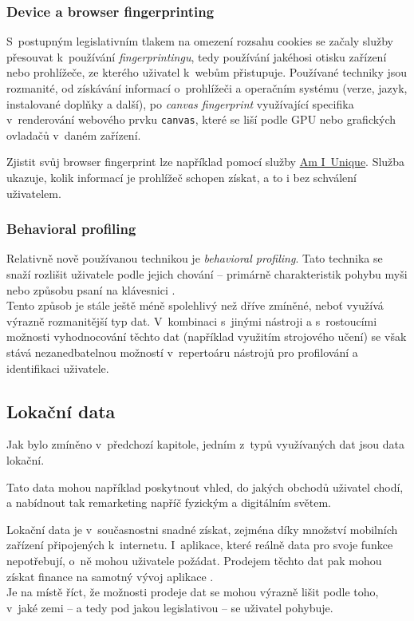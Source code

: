 \subsubsection*{Device a browser fingerprinting}
S~postupným legislativním tlakem na omezení rozsahu cookies se začaly služby přesouvat k~používání \textit{fingerprintingu}, tedy používání jakéhosi otisku zařízení nebo prohlížeče, ze kterého uživatel k~webům přistupuje. Používané techniky jsou rozmanité, od získávání informací o~prohlížeči a operačním systému (verze, jazyk, instalované doplňky a další), po \textit{canvas fingerprint} využívající specifika v~renderování webového prvku \verb|canvas|, které se liší podle GPU nebo grafických ovladačů v~daném zařízení.  

Zjistit svůj browser fingerprint lze například pomocí služby \href{https://amiunique.org/fp}{Am I~Unique}. Služba ukazuje, kolik informací je prohlížeč schopen získat, a to i bez schválení uživatelem.

\subsubsection*{Behavioral profiling}
Relativně nově používanou technikou je \textit{behavioral profiling}. Tato technika se snaží rozlišit uživatele podle jejich chování -- primárně charakteristik pohybu myši nebo způsobu psaní na klávesnici \citep{behavioral-profiling, mouse-behavioral-biometrics, digital-behavior-fingerprint}.\\
Tento způsob je stále ještě méně spolehlivý než dříve zmíněné, neboť využívá výrazně rozmanitější typ dat.
V~kombinaci s~jinými nástroji a s~rostoucími možnosti vyhodnocování těchto dat (například využitím strojového učení) se však stává nezanedbatelnou možností v~repertoáru nástrojů pro profilování a identifikaci uživatele.

\subsection{Lokační data}
Jak bylo zmíněno v~předchozí kapitole, jedním z~typů využívaných dat jsou data lokační.

Tato data mohou například poskytnout vhled, do jakých obchodů uživatel chodí, a nabídnout tak remarketing napříč fyzickým a digitálním světem.

Lokační data je v~současnostni snadné získat, zejména díky množství mobilních zařízení připojených k~internetu. I~aplikace, které reálně data pro svoje funkce nepotřebují, o~ně mohou uživatele požádat. Prodejem těchto dat pak mohou získat finance na samotný vývoj aplikace .\\
Je na místě říct, že možnosti prodeje dat se mohou výrazně lišit podle toho, v~jaké zemi -- a tedy pod jakou legislativou -- se uživatel pohybuje.

